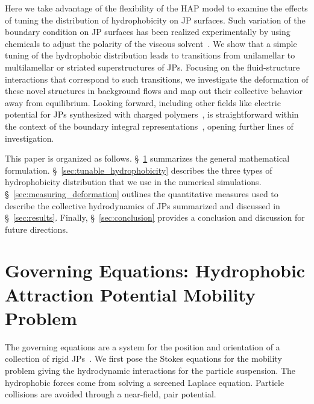 \documentclass[prb,preprint,showpacs,preprintnumbers,amsmath,amssymb,longbibliography]{revtex4-2}
\begin{document}

Here we take advantage of the flexibility of the HAP model to examine
the effects of tuning the distribution of hydrophobicity on JP surfaces.
Such variation of the boundary condition on JP surfaces has been
realized experimentally by using chemicals to adjust the polarity of the
viscous solvent~\cite{Zarzaretal2015, KirillovaMarschelkeSynytska2019,
doi:10.1021/la503455h}. We show that a simple tuning of the hydrophobic
distribution leads to transitions from unilamellar to multilamellar or
striated superstructures of JPs. Focusing on the fluid-structure
interactions that correspond to such transitions, we investigate the
deformation of these novel structures in background flows and map out
their collective behavior away from equilibrium. Looking forward,
including other fields like electric potential for JPs synthesized with
charged polymers~\cite{HongCacciutoLuijtenGranick2008,
doi:10.1021/la503455h, KangHonciuc2018}, is straightforward within the
context of the boundary integral
representations~\cite{kohl-cor-che-vee22}, opening further lines of
investigation.

This paper is organized as follows. \S~\ref{sec:governing_equations}
summarizes the general mathematical formulation.
\S~\ref{sec:tunable_hydrophobicity} describes the three types of
hydrophobicity distribution that we use in the numerical simulations.
\S~\ref{sec:measuring_deformation} outlines the quantitative measures
used to describe the collective hydrodynamics of JPs summarized and
discussed in \S~\ref{sec:results}. Finally, \S~\ref{sec:conclusion}
provides a conclusion and discussion for future directions.

\section{Governing Equations: Hydrophobic Attraction Potential Mobility Problem} 
\label{sec:governing_equations}
The governing equations are a system for the position and orientation of
a collection of rigid JPs~\cite{Fu2022_JFM}. We first pose the Stokes
equations for the mobility problem giving the hydrodynamic interactions
for the particle suspension. The hydrophobic forces come from solving a
screened Laplace equation. Particle collisions are avoided through a
near-field, pair potential.
\end{document}
